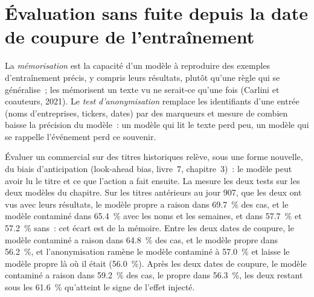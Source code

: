 \section{Évaluation sans fuite depuis la date de coupure de l'entraînement}

\begin{definition}\label{def:ml:large-language-models-in-finance:memo}
La \emph{mémorisation} est la capacité d'un modèle à reproduire des exemples d'entraînement précis, y compris leurs
résultats, plutôt qu'une règle qui se généralise~; les  mémorisent un texte vu ne serait-ce qu'une fois (Carlini et coauteurs, 2021).
Le \emph{test d'anonymisation} remplace les identifiants d'une entrée (noms d'entreprises, tickers, dates)
par des marqueurs et mesure de combien baisse la précision du modèle~: un modèle qui lit le texte perd peu, un modèle qui
se rappelle l'événement perd ce souvenir.
\end{definition}

Évaluer un  commercial sur des titres historiques relève, sous une forme nouvelle, du biais d'anticipation (look-ahead bias, livre~7, chapitre~3)~: le
modèle peut avoir lu le titre et ce que l'action a fait ensuite. La  mesure les deux tests sur les
deux modèles du chapitre. Sur les titres antérieurs au jour 907, que les deux ont vus avec leurs résultats, le modèle propre a raison dans 69.7~\% des
cas, et le modèle contaminé dans 65.4~\% avec les noms et les semaines, et dans 57.7~\% et 57.2~\% sans~: cet écart est de la mémoire. Entre les deux dates de coupure, le modèle contaminé a raison
dans 64.8~\% des cas, et le modèle propre dans 56.2~\%, et l'anonymisation ramène le modèle contaminé à 57.0~\% et laisse le
modèle propre là où il était (56.0~\%). Après les deux dates de coupure, le modèle contaminé a raison dans 59.2~\% des cas, le propre dans 56.3~\%, les deux
restant sous les 61.6~\% qu'atteint le signe de l'effet injecté.

